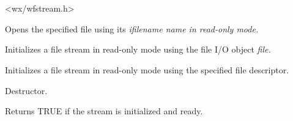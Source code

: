 \section{}\label{wxfileinputstream}




<wx/wfstream.h>






Opens the specified file using its \it{ifilename} name in read-only mode.


Initializes a file stream in read-only mode using the file I/O object \it{file}.


Initializes a file stream in read-only mode using the specified file descriptor.



Destructor.



Returns TRUE if the stream is initialized and ready.

\section{}\label{wxfileoutputstream}

